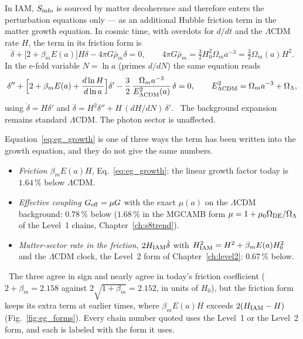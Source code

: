 In IAM, $S_{\rm info}$ is sourced by matter decoherence and therefore enters the perturbation equations only --- as an additional Hubble friction term in
the matter growth equation. In cosmic time, with overdots for $d/dt$ and the $\Lambda$CDM rate $H$, the term in its friction form is
\begin{equation}\ddot\delta+\big[2+\beta_mE(a)\big]H\dot\delta-4\pi G\bar\rho_m\delta=0,\qquad 4\pi G\bar\rho_m=\tfrac32H_0^2\Omega_ma^{-3}=\tfrac32\Omega_m(a)H^2 .
\label{eq:eg_growth}\end{equation}
In the e-fold variable $N=\ln a$ (primes $d/dN$) the same equation reads
\begin{equation}\delta''+\Big[2+\beta_mE(a)+\frac{d\ln H}{d\ln a}\Big]\delta'-\frac32\,\frac{\Omega_ma^{-3}}{E^2_{\Lambda{\rm CDM}}(a)}\,\delta=0,
\qquad E^2_{\Lambda{\rm CDM}}=\Omega_ma^{-3}+\Omega_\Lambda ,\label{eq:eg_growthN}\end{equation}
using $\dot\delta=H\delta'$ and $\ddot\delta=H^2\delta''+H\,(dH/dN)\,\delta'$. \derived\ The background expansion remains standard $\Lambda$CDM. The photon sector is
unaffected.

Equation~\eqref{eq:eg_growth} is one of three ways the term has been written into the growth equation, and they do not give the same numbers.
\begin{itemize}
\item \emph{Friction $\beta_mE(a)H$}, Eq.~\eqref{eq:eg_growth}: the linear growth factor today is $1.64\,\%$ below $\Lambda$CDM.
\item \emph{Effective coupling $G_{\rm eff}=\mu G$} with the exact $\mu(a)$ on the $\Lambda$CDM background: $0.78\,\%$ below ($1.68\,\%$ in the MGCAMB form $\mu=1+\mu_0\Omega_{\rm DE}/\Omega_\Lambda$ of the Level~1 chains, Chapter~\ref{ch:s8trend}).
\item \emph{Matter-sector rate in the friction}, $2H_{\rm IAM}\dot\delta$ with $H^2_{\rm IAM}=H^2+\beta_mE(a)H_0^2$ and the $\Lambda$CDM clock, the Level~2
form of Chapter~\ref{ch:level2}: $0.67\,\%$ below.
\end{itemize}
\calc\ The three agree in sign and nearly agree in today's friction coefficient ($2+\beta_m=2.158$ against $2\sqrt{1+\beta_m}=2.152$, in units of $H_0$),
but the friction form keeps its extra term at earlier times, where $\beta_mE(a)H$ exceeds $2(H_{\rm IAM}-H)$ (Fig.~\ref{fig:eg_forms}). Every chain number
quoted uses the Level~1 or the Level~2 form, and each is labeled with the form it uses.

